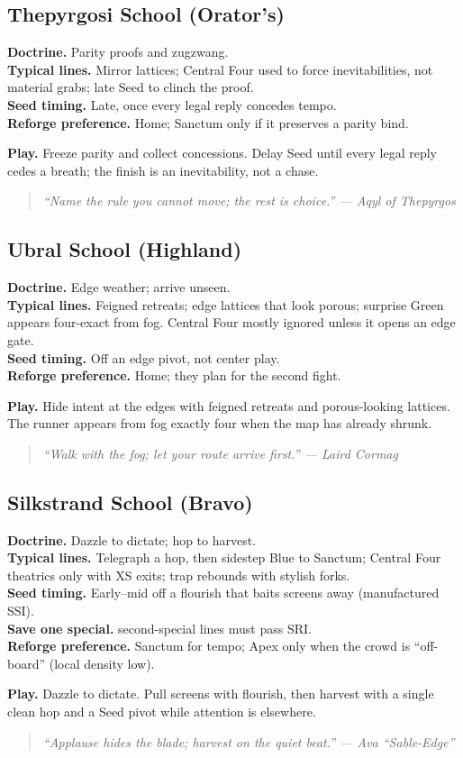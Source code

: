 \documentclass[11pt]{article}
\providecommand{\playdesc}[1]{\par\smallskip\noindent\small\textbf{Play.} #1\par}
\begin{document}
\subsection*{Thepyrgosi School (Orator’s)}
\textbf{Doctrine.} Parity proofs and zugzwang.\\
\textbf{Typical lines.} Mirror lattices; Central Four used to force inevitabilities, not material grabs; late Seed to clinch the proof.\\
\textbf{Seed timing.} Late, once every legal reply concedes tempo.\\
\textbf{Reforge preference.} Home; Sanctum only if it preserves a parity bind.
\playdesc{Freeze parity and collect concessions. Delay Seed until every legal reply cedes a breath; the finish is an inevitability, not a chase.}
\begin{quote}\small\itshape
“Name the rule you cannot move; the rest is choice.” — Aqyl of Thepyrgos
\end{quote}

\subsection*{Ubral School (Highland)}
\textbf{Doctrine.} Edge weather; arrive unseen.\\
\textbf{Typical lines.} Feigned retreats; edge lattices that look porous; surprise Green appears four-exact from fog. Central Four mostly ignored unless it opens an edge gate.\\
\textbf{Seed timing.} Off an edge pivot, not center play.\\
\textbf{Reforge preference.} Home; they plan for the second fight.
\playdesc{Hide intent at the edges with feigned retreats and porous-looking lattices. The runner appears from fog exactly four when the map has already shrunk.}
\begin{quote}\small\itshape
“Walk with the fog; let your route arrive first.” — Laird Cormag
\end{quote}

\subsection*{Silkstrand School (Bravo)}
\textbf{Doctrine.} Dazzle to dictate; hop to harvest.\\
\textbf{Typical lines.} Telegraph a hop, then sidestep Blue to Sanctum; Central Four theatrics only with XS exits; trap rebounds with stylish forks.\\
\textbf{Seed timing.} Early–mid off a flourish that baits screens away (manufactured SSI).\\
\textbf{Save one special.} second-special lines must pass SRI. \\
\textbf{Reforge preference.} Sanctum for tempo; Apex only when the crowd is ``off-board'' (local density low).
\playdesc{Dazzle to dictate. Pull screens with flourish, then harvest with a single clean hop and a Seed pivot while attention is elsewhere.}
\begin{quote}\small\itshape
“Applause hides the blade; harvest on the quiet beat.” — Ava “Sable-Edge”
\end{quote}
\end{document}
